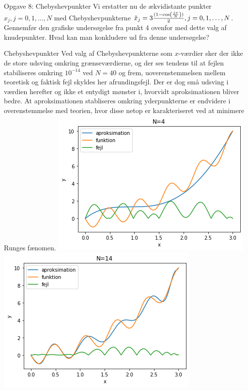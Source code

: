 \begin{frame}{Opgave 8: Chebyshevpunkter}
    Vi erstatter nu de ækvidistante punkter $x_j , j = 0, 1, \ldots , N$ med Chebyshevpunkterne $\Tilde{x}_j = 3 \frac{(1 -\cos(\frac{j \pi}{N}))}{2}, j = 0, 1, \ldots , N$. 
    Gennemfør den grafiske undersøgelse fra punkt 4 ovenfor med dette valg af knudepunkter. 
    Hvad kan man konkludere ud fra denne undersøgelse?
\end{frame}

\begin{frame}{Chebyshevpunkter}
    Ved valg af Chebyshevpunkterne som $x$-værdier sker der ikke de store udsving omkring grænseværdierne, og der ses tendens til at fejlen stabiliseres omkring $10^{{-14}}$ ved $N=40$ og frem, uoverenstemmelsen mellem teoretisk og faktisk fejl skyldes her afrundingsfejl. 
    Der er dog små udsving i værdien herefter og ikke et entydigt mønster i, hvorvidt aproksimationen bliver bedre.
    At aproksimationen stabliseres omkring yderpunkterne er endvidere i overenstemmelse med teorien, hvor disse netop er karakteriseret ved at minimere Runges fænomen.
   \includegraphics[scale=0.40]{images/chev_N=4.png}
   \includegraphics[scale=0.40]{images/Chev_N=14.png}
\end{frame}